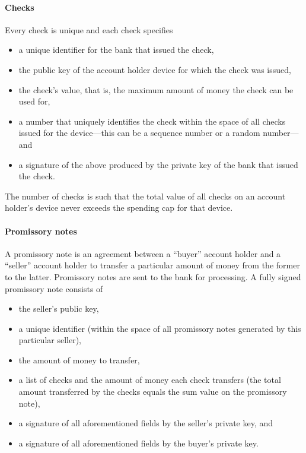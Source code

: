 \documentclass[12pt,a4paper]{article}
\begin{document}
\begin{multicols}{2}
	\paragraph{Checks}
	
	Every check is unique and each check specifies
	
	\begin{itemize}
		\item a unique identifier for the bank that issued the check,
		\item the public key of the account holder device for which the check was issued,
		\item the check's value, that is, the maximum amount of money the check can be used for, 
		\item a number that uniquely identifies the check within the space of all checks issued for the device---this can be a sequence number or a random number---and
		\item a signature of the above produced by the private key of the bank that issued the check. 
	\end{itemize}

	The number of checks is such that the total value of all checks on an account holder's device never exceeds the spending cap for that device.

	\paragraph{Promissory notes}
	
	A promissory note is an agreement between a ``buyer'' account holder and a ``seller'' account holder to transfer a particular amount of money from the former to the latter. Promissory notes are sent to the bank for processing. A fully signed promissory note consists of
	
	\begin{itemize}
		\item the seller's public key,
		\item a unique identifier (within the space of all promissory notes generated by this particular seller),
		\item the amount of money to transfer,
		\item a list of checks and the amount of money each check transfers (the total amount transferred by the checks equals the sum value on the promissory note),
		\item a signature of all aforementioned fields by the seller's private key,  and
		\item a signature of all aforementioned fields by the buyer's private key. 
	\end{itemize}


\end{multicols}
\end{document}
